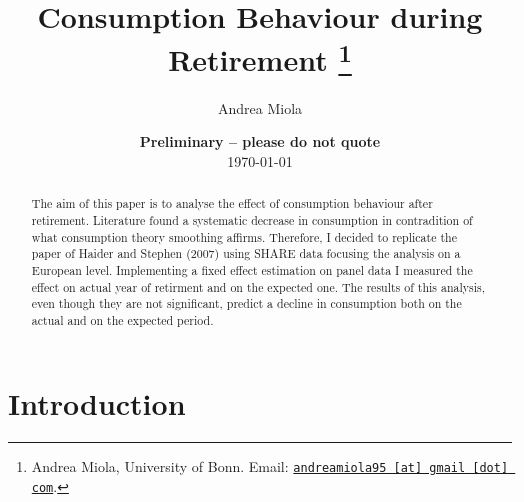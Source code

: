 \documentclass[11pt, a4paper, leqno]{article}
\begin{document}
\title{Consumption Behaviour during Retirement \thanks{Andrea Miola, University of Bonn. Email: \href{mailto:andreamiola95@gmail.com}{\nolinkurl{andreamiola95 [at] gmail [dot] com}}.}}

\author{Andrea Miola}

\date{
{\bf Preliminary -- please do not quote}
\\[1ex]
\today
}

\maketitle


\begin{abstract}
The aim of this paper is to analyse the effect of consumption behaviour after retirement. Literature found a systematic decrease in consumption in contradition of what consumption theory smoothing affirms. Therefore, I decided to replicate the paper of Haider and Stephen (2007) using SHARE data focusing the analysis on a European level. Implementing a fixed effect estimation on panel data I measured the effect on actual year of retirment and on the expected one. The results of this analysis, even though they are not significant, predict a decline in consumption both on the actual and on the expected period.

\end{abstract}
\clearpage

\section{Introduction} %
\label{sec:introduction}
\end{document}
